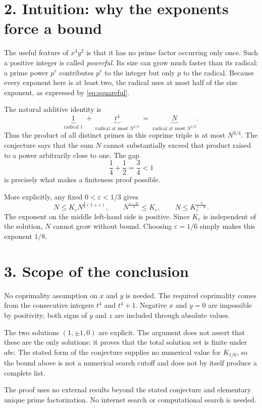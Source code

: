 \documentclass[11pt,a4paper]{article}
\begin{document}
\newpage
\section*{2. Intuition: why the exponents force a bound}
The useful feature of $x^3y^2$ is that it has no prime factor occurring
only once. Such a positive integer is called \emph{powerful}.
Its size can grow much faster than its radical: a prime power $p^e$
contributes $p^e$ to the integer but only $p$ to the radical.
Because every exponent here is at least two, the radical uses at most
half of the size exponent, as expressed by \eqref{eq:squareful}.

The natural additive identity is
\[
\underbrace{1}_{\text{radical }1}
\; + \;
\underbrace{t^4}_{\text{radical at most }N^{1/4}}
\; = \;
\underbrace{N}_{\text{radical at most }N^{1/2}}.
\]
Thus the product of all distinct primes in this coprime triple is at most
$N^{3/4}$. The conjecture says that the sum $N$ cannot substantially exceed
that product raised to a power arbitrarily close to one. The gap
\[
\frac14+\frac12=\frac34<1
\]
is precisely what makes a finiteness proof possible.

More explicitly, any fixed $0<\varepsilon<1/3$ gives
\[
N\le K_\varepsilon N^{\frac34(1+\varepsilon)},
\qquad
N^{\frac{1-3\varepsilon}{4}}\le K_\varepsilon,
\qquad
N\le K_\varepsilon^{\frac4{1-3\varepsilon}}.
\]
The exponent on the middle left-hand side is positive. Since
$K_\varepsilon$ is independent of the solution, $N$ cannot grow without
bound. Choosing $\varepsilon=1/6$ simply makes this exponent $1/8$.

\section*{3. Scope of the conclusion}
No coprimality assumption on $x$ and $y$ is needed. The required
coprimality comes from the consecutive integers $t^4$ and $t^4+1$.
Negative $x$ and $y=0$ are impossible by positivity; both signs of $y$
and $z$ are included through absolute values.

The two solutions $(1,\pm1,0)$ are explicit. The argument does not assert
that these are the only solutions: it proves that the total solution set
is finite under $abc$. The stated form of the conjecture supplies no
numerical value for $K_{1/6}$, so the bound above is not a numerical search
cutoff and does not by itself produce a complete list.

The proof uses no external results beyond the stated conjecture and
elementary unique prime factorization. No internet search or computational
search is needed.
\end{document}
